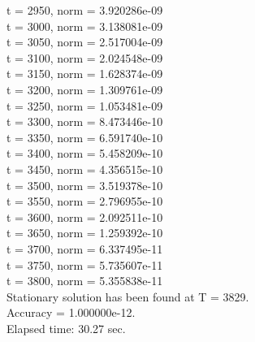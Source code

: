 \documentclass[12pt,a4paper]{article}
\begin{document}
\begin{center}
t = 2950, norm = 3.920286e-09 \\
t = 3000, norm = 3.138081e-09 \\
t = 3050, norm = 2.517004e-09 \\
t = 3100, norm = 2.024548e-09 \\
t = 3150, norm = 1.628374e-09 \\
t = 3200, norm = 1.309761e-09 \\
t = 3250, norm = 1.053481e-09 \\
t = 3300, norm = 8.473446e-10 \\
t = 3350, norm = 6.591740e-10 \\
t = 3400, norm = 5.458209e-10 \\
t = 3450, norm = 4.356515e-10 \\
t = 3500, norm = 3.519378e-10 \\
t = 3550, norm = 2.796955e-10 \\
t = 3600, norm = 2.092511e-10 \\
t = 3650, norm = 1.259392e-10 \\
t = 3700, norm = 6.337495e-11 \\
t = 3750, norm = 5.735607e-11 \\
t = 3800, norm = 5.355838e-11 \\
Stationary solution has been found at T = 3829. \\
Accuracy = 1.000000e-12. \\
Elapsed time: 30.27 sec. \\
\end{center}
 
\end{document}
